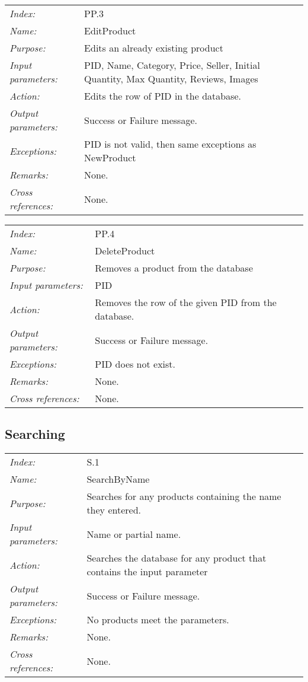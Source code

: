 \documentclass[10pt,letter]{article}
\begin{document}
\begin{tabularx}{\textwidth}{l X}
    \it{Index:} & PP.3 \\
    \it{Name:} & EditProduct \\
    \it{Purpose:} & Edits an already existing product\\
    \it{Input parameters:} & PID, Name, Category, Price, Seller, Initial Quantity, Max Quantity, Reviews, Images\\
    \it{Action:} & Edits the row of PID in the database.\\
    \it{Output parameters:} & Success or Failure message. \\
    \it{Exceptions:} & PID is not valid, then same exceptions as NewProduct \\
    \it{Remarks:} & None. \\
    \it{Cross references:} & None. \\
    \hline
\end{tabularx}

\begin{tabularx}{\textwidth}{l X}
    \it{Index:} & PP.4 \\
    \it{Name:} & DeleteProduct \\
    \it{Purpose:} & Removes a product from the database\\
    \it{Input parameters:} & PID\\
    \it{Action:} & Removes the row of the given PID from the database.\\
    \it{Output parameters:} & Success or Failure message. \\
    \it{Exceptions:} & PID does not exist. \\
    \it{Remarks:} & None. \\
    \it{Cross references:} & None. \\
    \hline
\end{tabularx}


\subsection{Searching}

\begin{tabularx}{\textwidth}{l X}
    \it{Index:} & S.1 \\
    \it{Name:} & SearchByName \\
    \it{Purpose:} & Searches for any products containing the name they entered.\\
    \it{Input parameters:} & Name or partial name.\\
    \it{Action:} & Searches the database for any product that contains the input parameter\\
    \it{Output parameters:} & Success or Failure message. \\
    \it{Exceptions:} & No products meet the parameters. \\
    \it{Remarks:} & None. \\
    \it{Cross references:} & None. \\
    \hline
\end{tabularx}
\end{document}
